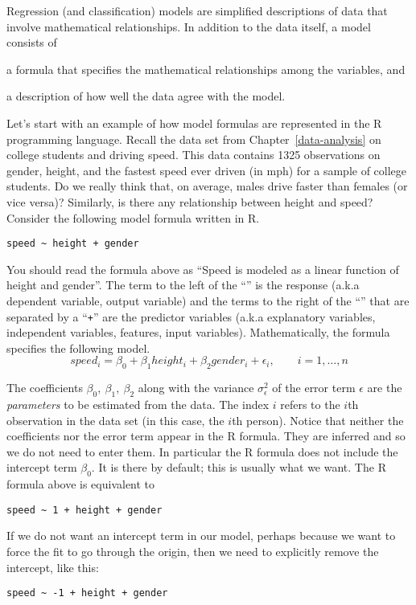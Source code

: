 Regression (and classification) models are simplified descriptions of
data that involve mathematical relationships. In addition to the data
itself, a model consists of \begin{inparaenum}[1)] \item a
  formula that specifies the mathematical relationships among the
  variables, and \item a description of how well the data agree with
  the model.
  \end{inparaenum} 
  Let's start with an example of how model formulas are represented in
  the R programming language. Recall the data set from
  Chapter~\ref{data-analysis} on college students and driving speed.
  This data contains \num{1325} observations on gender, height, and
  the fastest speed ever driven (in mph) for a sample of college
  students.  Do we really think that, on average, males drive faster
  than females (or vice versa)? Similarly, is there any relationship
  between height and speed? Consider the following model formula
written in R.
\begin{Verbatim}
speed ~ height + gender
\end{Verbatim}
You should read the formula above as ``Speed is modeled as a linear
function of height and gender''.  The term to the left of the
``\mtilde'' is the response (a.k.a dependent variable, output
variable) and the terms to the right of the ``\mtilde'' that are
separated by a ``\texttt{+}'' are the predictor variables (a.k.a
explanatory variables, independent variables, features, input
variables).  Mathematically, the formula specifies the following
model.
\begin{equation}
  speed_i = \beta_0 + \beta_1 height_i + \beta_2 gender_i + \epsilon_i, \qquad i=1,\ldots,n
\label{eq:speed-height-gender}
\end{equation}

The coefficients $\beta_0,~\beta_1,~\beta_2$ along with the variance
$\sigma_{\epsilon}^2$ of the error term $\epsilon$ are the \emph{parameters}
to be estimated from the data.  The index $i$ refers to the $i$th
observation in the data set (in this case, the $i$th person). Notice
that neither the coefficients nor the error term appear in the R
formula.  They are inferred and so we do not need to enter them. In
particular the R formula does not include the intercept term
$\beta_0$. It is there by default; this is usually what we want. The R
formula above is equivalent to
\begin{Verbatim}
speed ~ 1 + height + gender
\end{Verbatim}
If we do not want an intercept term in our model, perhaps because we want to
force the fit to go through the origin, then we need to explicitly remove
the intercept, like this:
\begin{Verbatim}
speed ~ -1 + height + gender
\end{Verbatim}

